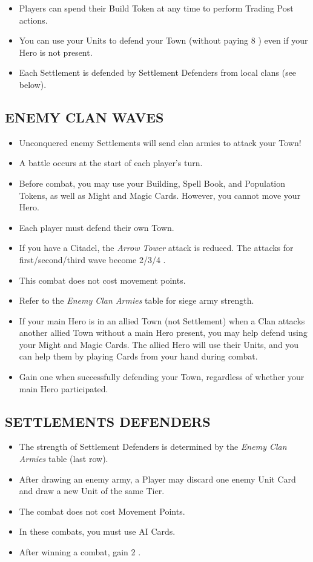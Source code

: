 \begin{multicols}{2}
\begin{itemize}
  \item Players can spend their Build Token at any time to perform Trading Post actions.
  \item You can use your Units to defend your Town (without paying 8 ) even if your Hero is not present.
  \item Each Settlement is defended by Settlement Defenders from local clans (see below).
\end{itemize}

\subsection*{\MakeUppercase{Enemy clan waves}}
\begin{itemize}
  \item Unconquered enemy Settlements will send clan armies to attack your Town!
  \item A battle occurs at the start of each player's turn.
  \item Before combat, you may use your Building, Spell Book, and Population Tokens, as well as Might and Magic Cards. However, you cannot move your Hero.
  \item Each player must defend their own Town.
  \item If you have a Citadel, the \textit{Arrow Tower} attack is reduced. The attacks for first/second/third wave become 2/3/4 .
  \item This combat does not cost movement points.
  \item Refer to the \textit{Enemy Clan Armies} table for siege army strength.
  \item If your main Hero is in an allied Town (not Settlement) when a Clan attacks another allied Town without a main Hero present, you may help defend using your Might and Magic Cards. The allied Hero will use their Units, and you can help them by playing Cards from your hand during combat.
  \item Gain one  when successfully defending your Town, regardless of whether your main Hero participated.
\end{itemize}

\subsection*{\MakeUppercase{Settlements defenders}}
\begin{itemize}
  \item The strength of Settlement Defenders is determined by the \textit{Enemy Clan Armies} table (last row).
  \item After drawing an enemy army, a Player may discard one enemy Unit Card and draw a new Unit of the same Tier.
  \item The combat does not cost Movement Points.
  \item In these combats, you must use AI Cards.
  \item After winning a combat, gain 2 .
\end{itemize}


\end{multicols}
